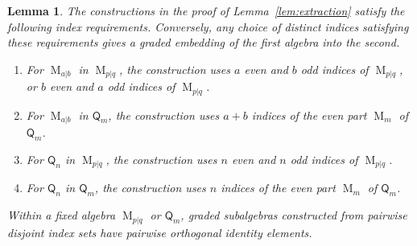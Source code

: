 \documentclass[11pt,reqno]{amsart}
\newcommand{\Mat}{\operatorname{M}}
\newcommand{\Qtype}{\mathsf Q}
\newtheorem{lemma}[theorem]{Lemma}
\theoremstyle{definition}
\theoremstyle{remark}
\numberwithin{equation}{section}
\begin{document}
\begin{lemma}\label{lem:local-capacity}
The constructions in the proof of
Lemma~\ref{lem:extraction} satisfy the following
index requirements.  Conversely, any choice of distinct indices satisfying
these requirements gives a graded embedding of the
first algebra into the second.

\begin{enumerate}
\item
For $\Mat_{a|b}$ in $\Mat_{p|q}$, the construction
uses $a$ even and $b$ odd indices of $\Mat_{p|q}$,
or $b$ even and $a$ odd indices of $\Mat_{p|q}$.
\item
For $\Mat_{a|b}$ in $\Qtype_m$, the construction
uses $a+b$ indices of the even part $\Mat_m$
of $\Qtype_m$.
\item
For $\Qtype_n$ in $\Mat_{p|q}$, the construction
uses $n$ even and $n$ odd indices of $\Mat_{p|q}$.
\item
For $\Qtype_n$ in $\Qtype_m$, the construction
uses $n$ indices of the even part $\Mat_m$
of $\Qtype_m$.
\end{enumerate}
Within a fixed algebra $\Mat_{p|q}$ or $\Qtype_m$,
graded subalgebras constructed from pairwise disjoint
index sets have pairwise orthogonal identity elements.

\end{lemma}
\end{document}
